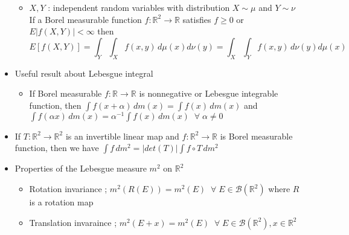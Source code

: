 \documentclass[12pt]{article}
\newcommand{\R}{\mathbb{R}}
\newcommand{\B}{\mathcal{B}}
\newcommand{\forany}{\; \forall \;}
\begin{document}
\begin{itemize}
    \begin{itemize}
        \item $X, Y$ : independent random variables with distribution $X\sim \mu$ and $Y\sim \nu$ \\ If a Borel measurable function $f:\R^2\rightarrow \R$ satisfies $f\geq 0$ or $E|f(X,Y)|<\infty$ then \\ $$E[f(X,Y)]=\int_Y\int_X f(x,y)\, d\mu(x)d\nu(y)=\int_X\int_Y f(x,y)\, d\nu(y)d\mu(x)$$
    \end{itemize}
    \item Useful result about Lebesgue integral
    \begin{itemize}
        \item If Borel measurable $f:\R\rightarrow \R$ is nonnegative or Lebesgue integrable function, then $\int f(x+\alpha)\, dm(x)=\int f(x)\, dm(x)$ and $\int f(\alpha x)\, dm(x)=\alpha^{-1}\int f(x)\, dm(x) \;\forany \alpha\neq 0$ 
    \end{itemize}
    \item If $T : \R^2\rightarrow \R^2$ is an invertible linear map and $f :\R^2\rightarrow \R$ is Borel measurable function, then we have $\int f\, dm^2=|det(T)|\int f\circ T\, dm^2$
    \item Properties of the Lebesgue measure $m^2$ on $\R^2$
    \begin{itemize}
        \item Rotation invariance ; $m^2(R(E))=m^2(E)\;\forany E\in \B(\R^2)$ where $R$ is a rotation map
        \item Translation invaraince ; $m^2(E+x)=m^2(E)\; \forany E\in \B(\R^2), x\in \R^2$ 
    \end{itemize}
\end{itemize}
\clearpage
\end{document}
